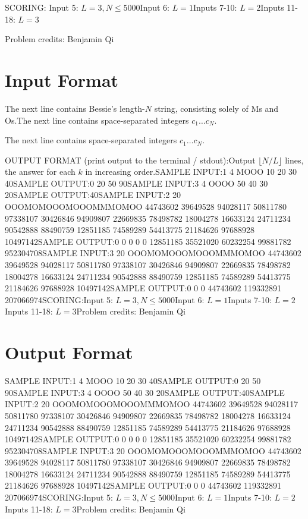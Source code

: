 \documentclass[12pt]{article}
\begin{document}
SCORING:
Input 5: $L=3, N\le 5000$Input 6: $L=1$Inputs 7-10: $L=2$Inputs 11-18: $L=3$


Problem credits: Benjamin Qi



\section*{Input Format}
The next line contains Bessie's length-$N$ string, consisting solely of Ms and
Os.The next line contains space-separated integers $c_1\dots c_N$.

The next line contains space-separated integers $c_1\dots c_N$.

OUTPUT FORMAT (print output to the terminal / stdout):Output $\lfloor N/L\rfloor$ lines, the answer for each $k$ in increasing order.SAMPLE INPUT:1 4
MOOO
10 20 30 40SAMPLE OUTPUT:0
20
50
90SAMPLE INPUT:3 4
OOOO
50 40 30 20SAMPLE OUTPUT:40SAMPLE INPUT:2 20
OOOMOMOOOMOOOMMMOMOO
44743602 39649528 94028117 50811780 97338107 30426846 94909807 22669835 78498782 18004278 16633124 24711234 90542888 88490759 12851185 74589289 54413775 21184626 97688928 10497142SAMPLE OUTPUT:0
0
0
0
0
12851185
35521020
60232254
99881782
952304708SAMPLE INPUT:3 20
OOOMOMOOOMOOOMMMOMOO
44743602 39649528 94028117 50811780 97338107 30426846 94909807 22669835 78498782 18004278 16633124 24711234 90542888 88490759 12851185 74589289 54413775 21184626 97688928 10497142SAMPLE OUTPUT:0
0
0
44743602
119332891
207066974SCORING:Input 5: $L=3, N\le 5000$Input 6: $L=1$Inputs 7-10: $L=2$Inputs 11-18: $L=3$Problem credits: Benjamin Qi

\section*{Output Format}
SAMPLE INPUT:1 4
MOOO
10 20 30 40SAMPLE OUTPUT:0
20
50
90SAMPLE INPUT:3 4
OOOO
50 40 30 20SAMPLE OUTPUT:40SAMPLE INPUT:2 20
OOOMOMOOOMOOOMMMOMOO
44743602 39649528 94028117 50811780 97338107 30426846 94909807 22669835 78498782 18004278 16633124 24711234 90542888 88490759 12851185 74589289 54413775 21184626 97688928 10497142SAMPLE OUTPUT:0
0
0
0
0
12851185
35521020
60232254
99881782
952304708SAMPLE INPUT:3 20
OOOMOMOOOMOOOMMMOMOO
44743602 39649528 94028117 50811780 97338107 30426846 94909807 22669835 78498782 18004278 16633124 24711234 90542888 88490759 12851185 74589289 54413775 21184626 97688928 10497142SAMPLE OUTPUT:0
0
0
44743602
119332891
207066974SCORING:Input 5: $L=3, N\le 5000$Input 6: $L=1$Inputs 7-10: $L=2$Inputs 11-18: $L=3$Problem credits: Benjamin Qi
\end{document}

